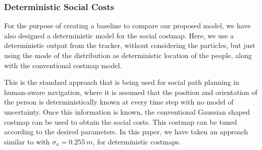 \subsubsection{Deterministic Social Costs}
For the purpose of creating a baseline to compare our proposed model, we have also designed a deterministic model for the social costmap. 
Here, we use a deterministic output from the tracker, without considering the particles, but just using the mode of the distribution as deterministic location of the people, along with the conventional costmap model. 


This is the standard approach that is being used for social path planning in human-aware navigation, where it is assumed that the position and orientation of the person is deterministically known at every time step with no model of uncertainty. Once this information is known, the conventional Gaussian shaped costmap can be used to obtain the social costs. This costmap can be tuned according to the desired parameters. In this paper, we have taken an approach similar to \cite{gomez2013social} with ${\sigma}_{x} = 0.255\ m$, for deterministic costmaps. 



